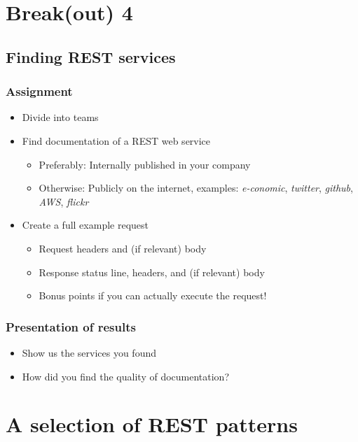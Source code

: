 \documentclass[8pt]{article}
\begin{document}
\section{Break(out) 4}
\label{sec:org9753337}
\subsection{Finding REST services}
\label{sec:orgb7fefd2}
\subsubsection{Assignment}
\label{sec:org72ff86a}
\begin{itemize}
\item Divide into teams

\item Find documentation of a REST web service
\begin{itemize}
\item Preferably: Internally published in your company
\item Otherwise: Publicly on the internet, examples: \emph{e-conomic}, \emph{twitter}, \emph{github}, \emph{AWS}, \emph{flickr}
\end{itemize}

\item Create a full example request
\begin{itemize}
\item Request headers and (if relevant) body
\item Response status line, headers, and (if relevant) body
\item Bonus points if you can actually execute the request!
\end{itemize}
\end{itemize}

\subsubsection{Presentation of results}
\label{sec:org3c976ca}
\begin{itemize}
\item Show us the services you found

\item How did you find the quality of documentation?
\end{itemize}
\section{A selection of REST patterns}
\label{sec:org011e3d5}
\end{document}
